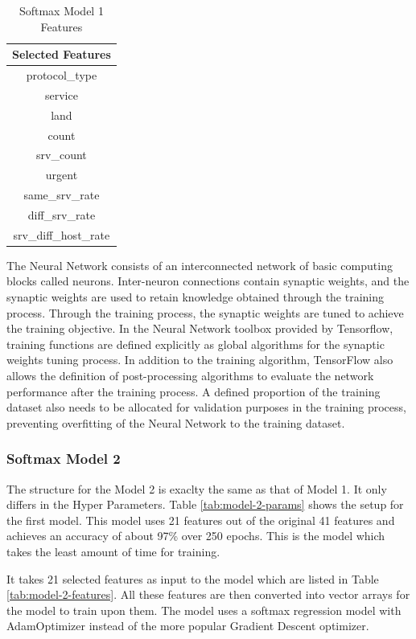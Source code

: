 \documentclass[12pt]{article}
\theoremstyle{definition}
\begin{document}
			\begin{table}[h!]
				\centering
				\caption{Softmax Model 1 Features}
				\label{tab:model-1-features}
				\begin{tabular}{|c|}
					\hline
					\bfseries{Selected Features} \\ \hline
					protocol\_type \\
					service \\
					land \\
					count \\
					srv\_count \\
					urgent \\
					same\_srv\_rate \\
					diff\_srv\_rate \\
					srv\_diff\_host\_rate \\
					\hline	
				\end{tabular}
				
			\end{table}
		The Neural Network consists of an interconnected network of basic computing blocks called
		neurons. Inter-neuron connections contain synaptic weights, and the synaptic weights are
		used to retain knowledge obtained through the training process. Through the training
		process, the synaptic weights are tuned to achieve the training objective. In the Neural Network
		toolbox provided by Tensorflow, training functions are defined explicitly as global
		algorithms for the synaptic weights tuning process. In addition to the training algorithm,
		TensorFlow also allows the definition of post-processing algorithms to evaluate the
		network performance after the training process. A defined proportion of the training
		dataset also needs to be allocated for validation purposes in the training process,
		preventing overfitting of the Neural Network to the training dataset.
		\subsubsection{Softmax Model 2}
		The structure for the Model 2 is exaclty the same as that of Model 1. It only differs in the Hyper Parameters. Table \ref{tab:model-2-params} shows the setup for the first model. This model uses 21 features out of the original 41 features and achieves an accuracy of about 97\% over 250 epochs. This is the model which takes the least amount of time for training. 
		
		It takes 21 selected features as input to the model which are listed in Table \ref{tab:model-2-features}. All these features are then converted into vector arrays for the model to train upon them. The model uses a softmax regression model with AdamOptimizer instead of the more popular Gradient Descent optimizer. 
		
\end{document}
